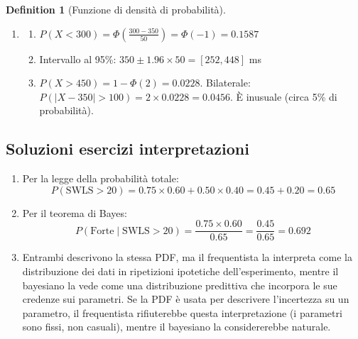 \documentclass[
  letterpaper,
  DIV=11,
  numbers=noendperiod,
  oneside]{scrreprt}
\newenvironment{Shaded}{\begin{snugshade}}{\end{snugshade}}
\newcommand{\AttributeTok}[1]{\textcolor[rgb]{0.40,0.45,0.13}{#1}}
\newcommand{\CommentTok}[1]{\textcolor[rgb]{0.37,0.37,0.37}{#1}}
\newcommand{\DecValTok}[1]{\textcolor[rgb]{0.68,0.00,0.00}{#1}}
\newcommand{\FloatTok}[1]{\textcolor[rgb]{0.68,0.00,0.00}{#1}}
\newcommand{\FunctionTok}[1]{\textcolor[rgb]{0.28,0.35,0.67}{#1}}
\newcommand{\NormalTok}[1]{\textcolor[rgb]{0.00,0.23,0.31}{#1}}
\newcommand{\SpecialCharTok}[1]{\textcolor[rgb]{0.37,0.37,0.37}{#1}}
\theoremstyle{definition}
\theoremstyle{plain}
\theoremstyle{definition}
\newtheorem{definition}{Definition}[chapter]
\theoremstyle{remark}
\begin{document}
\begin{definition}[Funzione di densità di
probabilità]
\begin{tcolorbox}
\begin{enumerate}
\begin{Shaded}
\begin{Highlighting}[]
\DecValTok{1} \SpecialCharTok{{-}} \FunctionTok{pnorm}\NormalTok{(}\DecValTok{25}\NormalTok{, }\AttributeTok{mean =} \DecValTok{20}\NormalTok{, }\AttributeTok{sd =} \DecValTok{5}\NormalTok{)  }\CommentTok{\# 0.1587}
\FunctionTok{pnorm}\NormalTok{(}\DecValTok{25}\NormalTok{, }\DecValTok{20}\NormalTok{, }\DecValTok{5}\NormalTok{) }\SpecialCharTok{{-}} \FunctionTok{pnorm}\NormalTok{(}\DecValTok{15}\NormalTok{, }\DecValTok{20}\NormalTok{, }\DecValTok{5}\NormalTok{)  }\CommentTok{\# 0.6827}
\FunctionTok{qnorm}\NormalTok{(}\FloatTok{0.90}\NormalTok{, }\AttributeTok{mean =} \DecValTok{20}\NormalTok{, }\AttributeTok{sd =} \DecValTok{5}\NormalTok{)  }\CommentTok{\# 26.41}
\end{Highlighting}
\end{Shaded}
\item
  \begin{enumerate}
  \def\labelenumii{\alph{enumii}.}
  \item
    \(P(X < 300) = \Phi\left(\frac{300-350}{50}\right) = \Phi(-1) = 0.1587\)
  \item
    Intervallo al 95\%: \(350 \pm 1.96 \times 50 = [252, 448]\) ms
  \item
    \(P(X > 450) = 1 - \Phi(2) = 0.0228\). Bilaterale:
    \(P(|X - 350| > 100) = 2 \times 0.0228 = 0.0456\). È inusuale (circa
    5\% di probabilità).
  \end{enumerate}
\end{enumerate}

\subsection*{Soluzioni esercizi
interpretazioni}\label{soluzioni-esercizi-interpretazioni}

\begin{enumerate}
\def\labelenumi{\arabic{enumi}.}
\setcounter{enumi}{7}
\item
  Per la legge della probabilità totale:
  \[P(\text{SWLS} > 20) = 0.75 \times 0.60 + 0.50 \times 0.40 = 0.45 + 0.20 = 0.65\]
\item
  Per il teorema di Bayes:
  \[P(\text{Forte} \mid \text{SWLS} > 20) = \frac{0.75 \times 0.60}{0.65} = \frac{0.45}{0.65} = 0.692\]
\item
  Entrambi descrivono la stessa PDF, ma il frequentista la interpreta
  come la distribuzione dei dati in ripetizioni ipotetiche
  dell'esperimento, mentre il bayesiano la vede come una distribuzione
  predittiva che incorpora le sue credenze sui parametri. Se la PDF è
  usata per descrivere l'incertezza su un parametro, il frequentista
  rifiuterebbe questa interpretazione (i parametri sono fissi, non
  casuali), mentre il bayesiano la considererebbe naturale.
\end{enumerate}


\end{tcolorbox}
\end{definition}
\end{document}
